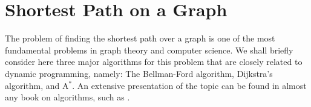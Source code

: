 



\section{Shortest Path on a Graph
}
The problem of finding the shortest path over a graph is one of the most fundamental problems in graph theory and computer science. We shall briefly consider here three major algorithms for this problem that are closely related to dynamic programming, namely: The Bellman-Ford algorithm, Dijkstra's algorithm, and A$^*$.
An extensive presentation of the topic can be found in almost any book on algorithms, such as \cite{cormen2009introduction,KleinbergTardos06,DasguptaPapadimitriouVazirani08}.

